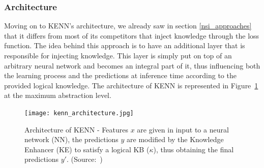 \subsubsection{Architecture}
Moving on to KENN's architecture, we already saw in section \ref{nsi_approaches} that it differs from most of its competitors that inject knowledge through the loss function. The idea behind this approach is to have an additional layer that is responsible for injecting knowledge. This layer is simply put on top of an arbitrary neural network and becomes an integral part of it, thus influencing both the learning process and the predictions at inference time according to the provided logical knowledge. The architecture of KENN is represented in Figure~\ref{fig:kenn_architecture} at the maximum abstraction level.

\begin{figure}[H]
    \centering
    \texttt{[image: kenn\_architecture.jpg]}
    \caption{ Architecture of KENN - Features $ x $ are given in input to a neural network (NN), the predictions $ y $ are modified by the Knowledge Enhancer (KE) to satisfy a logical KB ($ \kappa $), thus obtaining the final predictions $ y'$. (Source:~\cite{kenn})}
    \label{fig:kenn_architecture}
\end{figure}

